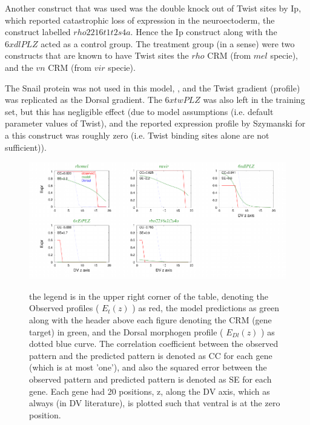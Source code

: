 Another construct that was used was the double knock out of Twist sites by Ip, which reported catastrophic loss of expression in the neuroectoderm, the construct labelled $rho2216t1t2s4a$.  Hence the Ip construct along with the $6xdlPLZ$ acted as a control group.  The treatment group (in a sense) were two constructs that are known to have Twist sites the $rho$ CRM (from $mel$ specie), and the $vn$ CRM (from $vir$ specie).
 
The Snail protein was not used in this model, , and the Twist gradient (profile) was replicated as the Dorsal gradient.  The $6xtwPLZ$ was also left in the training set, but this has negligible effect (due to model assumptions (i.e. default parameter values of Twist), and the reported expression profile by Szymanski for a this construct was roughly zero (i.e. Twist binding sites alone are not sufficient)).
\begin{figure}
  \includegraphics[width=1\textwidth]{DInosnail.pdf}\\
  \caption{the legend is in the upper right corner of the table, denoting the Observed profiles ( $E_t(z)$ ) as red, the model predictions as green along with the header above each figure denoting the CRM (gene target) in green, and the Dorsal morphogen profile  ( $E_{Dl}(z)$ ) as dotted blue curve.  The correlation coefficient between the observed pattern and the predicted pattern is denoted as CC for each gene (which is at most 'one'), and also the squared error between the observed pattern and predicted pattern is denoted as SE for each gene.  Each gene had 20 positions, z, along the DV axis, which as always (in DV literature), is plotted such that ventral is at the zero position.  }\label{roughfit}
\end{figure}


